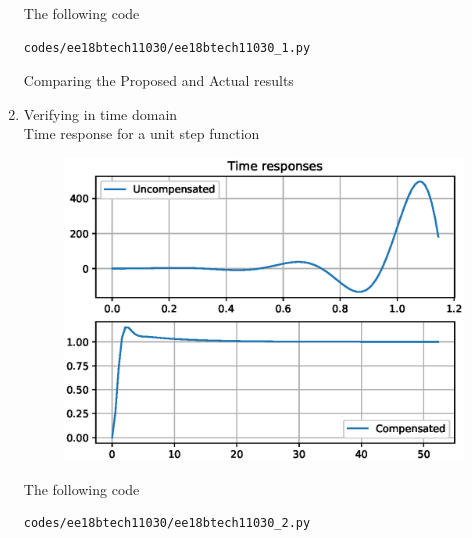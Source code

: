 \begin{enumerate}[label=\thesubsection.\arabic*.,ref=\thesubsection.\theenumi]
The following code 
\begin{lstlisting}
codes/ee18btech11030/ee18btech11030_1.py
\end{lstlisting}


\begin{table}[!ht]
\centering

\caption{Comparing the Proposed and Actual results}
\label{table:ee18btech11030_table}
\end{table}

\item Verifying in time domain 
\\
\solution 
Time response for a unit step function

\begin{figure}[!ht]
\centering
  \includegraphics[width=\columnwidth]{./figs/ee18btech11030/ee18btech11030_3.eps}
\caption{}
\label{fig:ee18btech11030_3} 
\end{figure}

The following code 
\begin{lstlisting}
codes/ee18btech11030/ee18btech11030_2.py
\end{lstlisting}

\end{enumerate}
